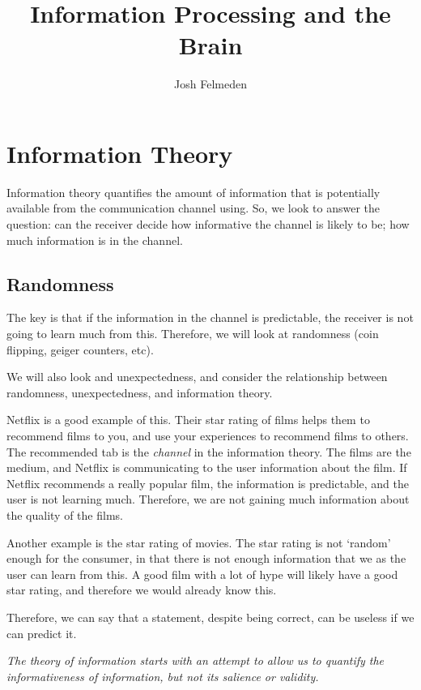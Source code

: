 \documentclass[11pt,a4paper,titlepage,dvipsnames,cmyk]{scrartcl}
\title{Information Processing and the Brain}
\author{Josh Felmeden}
\begin{document}
\maketitle
\tableofcontents
\newpage
\section{Information Theory}
Information theory quantifies the amount of information that is potentially available from the communication channel using. So, we look to answer the question: can the receiver decide how informative the channel is likely to be; how much information is in the channel.

\subsection{Randomness}
The key is that if the information in the channel is predictable, the receiver is not going to learn much from this. Therefore, we will look at randomness (coin flipping, geiger counters, etc).

We will also look and unexpectedness, and consider the relationship between randomness, unexpectedness, and information theory.

Netflix is a good example of this. Their star rating of films helps them to recommend films to you, and use your experiences to recommend films to others. The recommended tab is the \textit{channel} in the information theory. The films are the medium, and Netflix is communicating to the user information about the film. If Netflix recommends a really popular film, the information is predictable, and the user is not learning much. Therefore, we are not gaining much information about the quality of the films.

Another example is the star rating of movies. The star rating is not `random' enough for the consumer, in that there is not enough information that we as the user can learn from this. A good film with a lot of hype will likely have a good star rating, and therefore we would already know this.

Therefore, we can say that a statement, despite being correct, can be useless if we can predict it.

\begin{tcolorbox}
\textit{The theory of information starts with an attempt to allow us to quantify the informativeness of information, but not its salience or validity.}
\end{tcolorbox}
\end{document}

